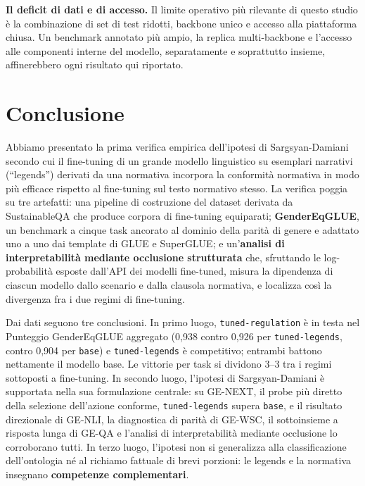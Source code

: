 \documentclass[pdflatex, sn-apa]{sn-jnl}%
\theoremstyle{thmstyleone}%
\theoremstyle{thmstyletwo}%
\theoremstyle{thmstylethree}%
\newcommand{\modelbase}{\texttt{base}}
\newcommand{\modellegends}{\texttt{tuned-legends}}
\newcommand{\modelreg}{\texttt{tuned-regulation}}
\begin{document}
\textbf{Il deficit di dati e di accesso.} Il limite operativo più rilevante di
questo studio è la combinazione di set di test ridotti, backbone unico e accesso
alla piattaforma chiusa. Un benchmark annotato più ampio, la replica multi-backbone
e l'accesso alle componenti interne del modello, separatamente e soprattutto
insieme, affinerebbero ogni risultato qui riportato.

\section{Conclusione}
\label{sec:conclusion}

Abbiamo presentato la prima verifica empirica dell'ipotesi di Sargsyan-Damiani
secondo cui il fine-tuning di un grande modello linguistico su esemplari narrativi
(``legends'') derivati da una normativa incorpora la conformità normativa in modo
più efficace rispetto al fine-tuning sul testo normativo stesso. La verifica poggia
su tre artefatti: una pipeline di costruzione del dataset derivata da SustainableQA
che produce corpora di fine-tuning equiparati; \textbf{GenderEqGLUE}, un benchmark
a cinque task ancorato al dominio della parità di genere e adattato uno a uno dai
template di GLUE e SuperGLUE; e un'\textbf{analisi di interpretabilità mediante
occlusione strutturata} che, sfruttando le log-probabilità esposte dall'API dei
modelli fine-tuned, misura la dipendenza di ciascun modello dallo scenario e dalla
clausola normativa, e localizza così la divergenza fra i due regimi di
fine-tuning.

Dai dati seguono tre conclusioni. In primo luogo, \modelreg{} è in testa nel
Punteggio GenderEqGLUE aggregato (0,938 contro 0,926 per \modellegends, contro
0,904 per \modelbase) e \modellegends{} è competitivo; entrambi battono nettamente
il modello base. Le vittorie per task si dividono 3--3 tra i regimi sottoposti a
fine-tuning. In secondo luogo, l'ipotesi di Sargsyan-Damiani è supportata nella sua
formulazione centrale: su GE-NEXT, il probe più diretto della selezione dell'azione
conforme, \modellegends{} supera \modelbase{}, e il risultato direzionale di
GE-NLI, la diagnostica di parità di GE-WSC, il sottoinsieme a risposta lunga di
GE-QA e l'analisi di interpretabilità mediante occlusione lo corroborano tutti. In
terzo luogo, l'ipotesi non si generalizza alla classificazione dell'ontologia né al
richiamo fattuale di brevi porzioni: le legends e la normativa insegnano
\textbf{competenze complementari}.
\end{document}

